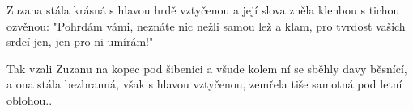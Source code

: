 \beginverse{}
\chordsoff{}
Zuzana stála krásná s hlavou hrdě vztyčenou
a její slova zněla klenbou s tichou ozvěnou:
"Pohrdám vámi, neznáte nic nežli samou lež a klam,
pro tvrdost vašich srdcí jen, jen pro ni umírám!"
\chordson{}
\endverse{}

\beginverse{}
\chordsoff{}
Tak vzali Zuzanu na kopec pod šibenici
a všude kolem ní se sběhly davy běsnící,
a ona stála bezbranná, však s hlavou vztyčenou,
zemřela tiše samotná pod letní oblohou..
\chordson{}
\endverse{}

\endsong{}

